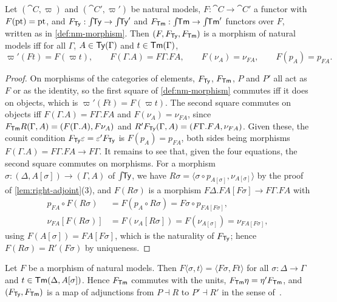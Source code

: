 \begin{lemma}\label{lem:nm-morphism}
    Let $(\cat{C}, \varpi)$ and $(\cat{C}', \varpi')$ be natural models, $F : \cat{C} \to \cat{C}'$ a functor with $F(\mathrm{pt}) = \mathrm{pt}$, and $F_{\mathsf{Ty}} : \int\!\!\mathsf{Ty} \to \int\!\!\mathsf{Ty}'$ and $F_{\mathsf{Tm}} : \int\!\!\mathsf{Tm} \to \int\!\!\mathsf{Tm}'$ functors over $F$, written as in \cref{def:nm-morphism}. Then $(F, F_{\mathsf{Ty}}, F_{\mathsf{Tm}})$ is a morphism of natural models iff for all $\Gamma$, $A \in \mathsf{Ty}(\Gamma)$ and $t \in \mathsf{Tm}(\Gamma)$,
    \[
        \varpi'(Ft) = F(\varpi t), \qquad F(\Gamma.A) = F\Gamma.FA, \qquad F(\nu_A) = \nu_{FA}, \qquad F(p_A) = p_{FA}.
    \]
\end{lemma}

\begin{proof}
    On morphisms of the categories of elements, $F_{\mathsf{Ty}}$, $F_{\mathsf{Tm}}$, $P$ and $P'$ all act as $F$ or as the identity, so the first square of \cref{def:nm-morphism} commutes iff it does on objects, which is $\varpi'(Ft) = F(\varpi t)$. The second square commutes on objects iff $F(\Gamma.A) = F\Gamma.FA$ and $F(\nu_A) = \nu_{FA}$, since $F_{\mathsf{Tm}} R(\Gamma, A) = (F(\Gamma.A), F\nu_A)$ and $R' F_{\mathsf{Ty}}(\Gamma, A) = (F\Gamma.FA, \nu_{FA})$. Given these, the counit condition $F_{\mathsf{Ty}} \varepsilon = \varepsilon' F_{\mathsf{Ty}}$ is $F(p_A) = p_{FA}$, both sides being morphisms $F(\Gamma.A) = F\Gamma.FA \to F\Gamma$. It remains to see that, given the four equations, the second square commutes on morphisms. For a morphism $\sigma : (\Delta, A[\sigma]) \to (\Gamma, A)$ of $\int\!\!\mathsf{Ty}$, we have $R\sigma = \langle \sigma \circ p_{A[\sigma]}, \nu_{A[\sigma]} \rangle$ by the proof of \cref{lem:right-adjoint}(3), and $F(R\sigma)$ is a morphism $F\Delta.FA[F\sigma] \to F\Gamma.FA$ with
    \begin{align*}
        p_{FA} \circ F(R\sigma) &= F(p_A \circ R\sigma) = F\sigma \circ p_{FA[F\sigma]},\\
        \nu_{FA}[F(R\sigma)] &= F(\nu_A[R\sigma]) = F(\nu_{A[\sigma]}) = \nu_{FA[F\sigma]},
    \end{align*}
    using $F(A[\sigma]) = FA[F\sigma]$, which is the naturality of $F_{\mathsf{Ty}}$; hence $F(R\sigma) = R'(F\sigma)$ by uniqueness.
\end{proof}

\begin{lemma}\label{lem:map-of-adjunctions}
    Let $F$ be a morphism of natural models. Then $F\langle \sigma, t \rangle = \langle F\sigma, Ft \rangle$ for all $\sigma : \Delta \to \Gamma$ and $t \in \mathsf{Tm}(\Delta, A[\sigma])$. Hence $F_{\mathsf{Tm}}$ commutes with the units, $F_{\mathsf{Tm}} \eta = \eta' F_{\mathsf{Tm}}$, and $(F_{\mathsf{Ty}}, F_{\mathsf{Tm}})$ is a map of adjunctions from $P \dashv R$ to $P' \dashv R'$ in the sense of~\cite[\S IV.7]{MacLane1998}.
\end{lemma}

